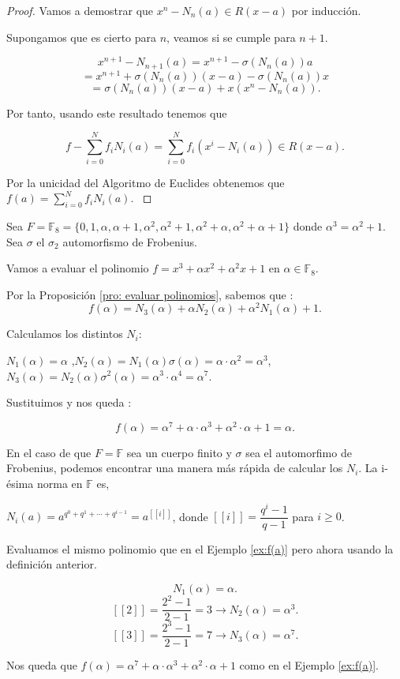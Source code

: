 \begin{proof}
    Vamos a demostrar que $x^n - N_n(a) \in R(x-a)$ por inducción.

    Supongamos que es cierto para $n$, veamos si se cumple para $n+1$.
    
    \[ x^{n+1} - N_{n+1}(a) = x^{n+1} - \sigma(N_{n}(a))a \]
    \[ = x^{n+1} + \sigma(N_{n}(a))(x-a) - \sigma(N_{n}(a))x  \]
    \[  = \sigma(N_{n}(a))(x-a) + x(x^n - N_n(a)). \]

Por tanto, usando este resultado tenemos que

\[ f - \sum_{i=0}^N f_i N_i(a) = \sum_{i=0}^N f_i(x^i - N_i(a)) \in R(x-a) . \]

Por la unicidad del Algoritmo de Euclides obtenemos que $f(a) = \sum_{i=0}^N f_iN_i(a)$. \cite{Vandermonde}
\end{proof}


\begin{exampleth}
\label{ex:f(a)}
  Sea $F = \mathbb{F}_{8} = \{ 0,1,\alpha,\alpha+1, \alpha^2, \alpha^2 +1,\alpha^2 + \alpha, \alpha^2 + \alpha + 1 \}$ donde $\alpha^3 = \alpha^2 + 1$. Sea $\sigma$ el $\sigma_2$ automorfismo de Frobenius.

  Vamos a evaluar el polinomio $f = x^3 + \alpha x^2 + \alpha^2 x +1$ en $\alpha \in \mathbb{F}_{8}$.

Por la Proposición \ref{pro: evaluar polinomios}, sabemos que :
\[ f(\alpha) = N_3(\alpha) + \alpha N_2(\alpha) + \alpha^2 N_1(\alpha) + 1.\]

Calculamos los distintos $N_i$:

$ N_1(\alpha) = \alpha$ ,$N_2(\alpha) = N_1(\alpha)\sigma(\alpha) = \alpha \cdot \alpha^2 = \alpha^3$, $N_3(\alpha) = N_2(\alpha)\sigma^2(\alpha) = \alpha^3 \cdot \alpha^4  = \alpha^7$.

Sustituimos y nos queda :

\[ f(\alpha) = \alpha^7 + \alpha \cdot \alpha^3 + \alpha^2 \cdot \alpha + 1 = \alpha .\]
\end{exampleth}

En el caso de que $F= \mathbb{F}$ sea un cuerpo finito y $\sigma$ sea el automorfimo de Frobenius, podemos encontrar una manera más rápida de calcular los $N_i$. La i-ésima norma en $\mathbb{F}$ es,

$N_i(a) = a^{q^0+q^1+ \cdots + q^{i-1}} = a^{[[i]]}$, donde $[[i]] = \dfrac{q^i-1}{q-1}$ para $i \geq 0$.

\begin{exampleth}
 Evaluamos el mismo polinomio que en el Ejemplo \ref{ex:f(a)} pero ahora usando la definición anterior.

 \[N_1(\alpha) = \alpha .\]
 \[[[2]] = \dfrac{2^2-1}{2-1} = 3 \rightarrow N_2(\alpha) = \alpha^3.\]
 \[[[3]] = \dfrac{2^3-1}{2-1} = 7 \rightarrow N_3(\alpha) = \alpha^7.\]

Nos queda que $f(\alpha) = \alpha^7 + \alpha \cdot \alpha^3 + \alpha^2 \cdot \alpha + 1 $ como en el Ejemplo \ref{ex:f(a)}.
\end{exampleth}

